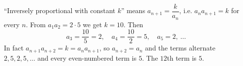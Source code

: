 ``Inversely proportional with constant $k$'' means $a_{n+1}=\dfrac{k}{a_n}$, i.e. $a_na_{n+1}=k$ for every $n$. From $a_1a_2=2\cdot5$ we get $k=10$. Then
\[a_3=\dfrac{10}{5}=2,\quad a_4=\dfrac{10}{2}=5,\quad a_5=2,\ \dots\]
In fact $a_{n+1}a_{n+2}=k=a_na_{n+1}$, so $a_{n+2}=a_n$ and the terms alternate $2,5,2,5,\dots$ and every even-numbered term is $5$. The $12$th term is $\boxed{5}$.
